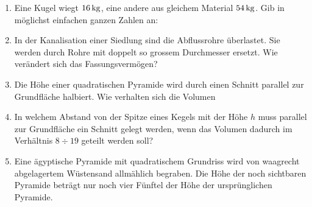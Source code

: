 \documentclass[%
11pt,%
twoside,%
titlepage,%
a4page,%
headsepline%
]{scrartcl}
\begin{document}
\begin{enumerate}
\item Eine Kugel wiegt $\unit[16]{kg}$, eine andere aus gleichem Material $\unit[54]{kg}$. Gib in m\"oglichst einfachen ganzen Zahlen an:
\item In der Kanalisation einer Siedlung sind die Abflussrohre \"uberlastet. Sie werden durch Rohre mit doppelt so grossem Durchmesser ersetzt. Wie ver\"andert sich das Fassungsverm\"ogen?
\item Die H\"ohe einer quadratischen Pyramide wird durch einen Schnitt parallel zur Grundfl\"ache halbiert. Wie verhalten sich die Volumen
\item In welchem Abstand von der Spitze eines Kegels mit der H\"ohe $h$ muss parallel zur Grundfl\"ache ein Schnitt gelegt werden, wenn das Volumen dadurch im Verh\"altnis $8\div19$ geteilt werden soll?

\item Eine \"agyptische Pyramide mit quadratischem Grundriss wird von waagrecht abgelagertem W\"ustensand allm\"ahlich begraben. Die H\"ohe der noch sichtbaren Pyramide betr\"agt nur noch vier F\"unftel der H\"ohe der urspr\"unglichen Pyramide.

\pagebreak


\end{enumerate}
\end{document}
